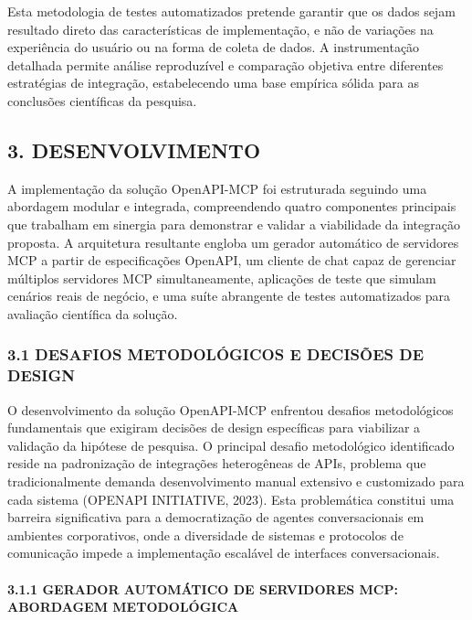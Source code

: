 \documentclass[
]{article}
\begin{document}
Esta metodologia de testes automatizados pretende garantir que os dados
sejam resultado direto das características de implementação, e não de
variações na experiência do usuário ou na forma de coleta de dados. A
instrumentação detalhada permite análise reproduzível e comparação
objetiva entre diferentes estratégias de integração, estabelecendo uma
base empírica sólida para as conclusões científicas da pesquisa.

\subsection{3. DESENVOLVIMENTO}\label{desenvolvimento}

A implementação da solução OpenAPI-MCP foi estruturada seguindo uma
abordagem modular e integrada, compreendendo quatro componentes
principais que trabalham em sinergia para demonstrar e validar a
viabilidade da integração proposta. A arquitetura resultante engloba um
gerador automático de servidores MCP a partir de especificações OpenAPI,
um cliente de chat capaz de gerenciar múltiplos servidores MCP
simultaneamente, aplicações de teste que simulam cenários reais de
negócio, e uma suíte abrangente de testes automatizados para avaliação
científica da solução.

\subsubsection{3.1 DESAFIOS METODOLÓGICOS E DECISÕES DE
DESIGN}\label{desafios-metodoluxf3gicos-e-decisuxf5es-de-design}

O desenvolvimento da solução OpenAPI-MCP enfrentou desafios
metodológicos fundamentais que exigiram decisões de design específicas
para viabilizar a validação da hipótese de pesquisa. O principal desafio
metodológico identificado reside na padronização de integrações
heterogêneas de APIs, problema que tradicionalmente demanda
desenvolvimento manual extensivo e customizado para cada sistema
(OPENAPI INITIATIVE, 2023). Esta problemática constitui uma barreira
significativa para a democratização de agentes conversacionais em
ambientes corporativos, onde a diversidade de sistemas e protocolos de
comunicação impede a implementação escalável de interfaces
conversacionais.

\paragraph{3.1.1 GERADOR AUTOMÁTICO DE SERVIDORES MCP: ABORDAGEM
METODOLÓGICA}\label{gerador-automuxe1tico-de-servidores-mcp-abordagem-metodoluxf3gica}
\end{document}
